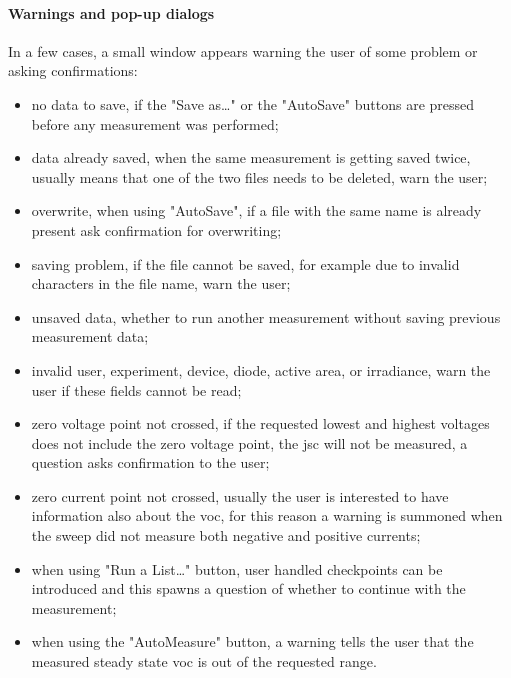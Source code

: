 		\paragraph{Warnings and pop-up dialogs}
		In a few cases, a small window appears warning the user of some problem or asking confirmations:
		\begin{itemize}
			\item no data to save, if the "Save as\dots" or the "AutoSave" buttons are pressed before any measurement was performed;
			\item data already saved, when the same measurement is getting saved twice, usually means that one of the two files needs to be deleted, warn the user;
			\item overwrite, when using "AutoSave", if a file with the same name is already present ask confirmation for overwriting;
			\item saving problem, if the file cannot be saved, for example due to invalid characters in the file name, warn the user;
			\item unsaved data, whether to run another measurement without saving previous measurement data;
			\item invalid user, experiment, device, diode, active area, or irradiance, warn the user if these fields cannot be read;
			\item zero voltage point not crossed, if the requested lowest and highest voltages does not include the zero voltage point, the \gls{jsc} will not be measured, a question asks confirmation to the user;
			\item zero current point not crossed, usually the user is interested to have information also about the \gls{voc}, for this reason a warning is summoned when the sweep did not measure both negative and positive currents;
			\item when using "Run a List\dots" button, user handled checkpoints can be introduced and this spawns a question of whether to continue with the measurement;
			\item when using the "AutoMeasure" button, a warning tells the user that the measured steady state \gls{voc} is out of the requested range.
		\end{itemize}

